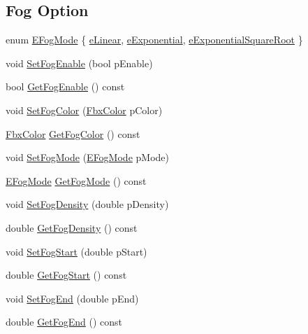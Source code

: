 \subsection*{Fog Option}
\begin{DoxyCompactItemize}
\item 
enum \hyperlink{class_fbx_global_light_settings_a2d6040cb267cbdb092bdf9fb73de8d6d}{E\+Fog\+Mode} \{ \hyperlink{class_fbx_global_light_settings_a2d6040cb267cbdb092bdf9fb73de8d6da646b9c79dbeb8d2d8ac6768e6e33d07c}{e\+Linear}, 
\hyperlink{class_fbx_global_light_settings_a2d6040cb267cbdb092bdf9fb73de8d6dac83435f2003c3a89d206f49ce9396562}{e\+Exponential}, 
\hyperlink{class_fbx_global_light_settings_a2d6040cb267cbdb092bdf9fb73de8d6da498e5d24544400cc9a9c959eadb3064c}{e\+Exponential\+Square\+Root}
 \}
\item 
void \hyperlink{class_fbx_global_light_settings_a8236e86da20394c673183e762760d6f0}{Set\+Fog\+Enable} (bool p\+Enable)
\item 
bool \hyperlink{class_fbx_global_light_settings_abceecba4b43b858168125d70c5d451ec}{Get\+Fog\+Enable} () const
\item 
void \hyperlink{class_fbx_global_light_settings_a021ab12c926a62587c8e97b579f3d1d6}{Set\+Fog\+Color} (\hyperlink{class_fbx_color}{Fbx\+Color} p\+Color)
\item 
\hyperlink{class_fbx_color}{Fbx\+Color} \hyperlink{class_fbx_global_light_settings_a78ab759ac52d0d618eb275a9149feedd}{Get\+Fog\+Color} () const
\item 
void \hyperlink{class_fbx_global_light_settings_a61010aa498fa159fa6fa91cf77d78501}{Set\+Fog\+Mode} (\hyperlink{class_fbx_global_light_settings_a2d6040cb267cbdb092bdf9fb73de8d6d}{E\+Fog\+Mode} p\+Mode)
\item 
\hyperlink{class_fbx_global_light_settings_a2d6040cb267cbdb092bdf9fb73de8d6d}{E\+Fog\+Mode} \hyperlink{class_fbx_global_light_settings_a29f90b9f3f5c1a9057cf226c80892df1}{Get\+Fog\+Mode} () const
\item 
void \hyperlink{class_fbx_global_light_settings_a9aa9fb5c44351b8b4ef9caf1968ca32f}{Set\+Fog\+Density} (double p\+Density)
\item 
double \hyperlink{class_fbx_global_light_settings_ad69be94b5061ada689c5103f8b3c44c2}{Get\+Fog\+Density} () const
\item 
void \hyperlink{class_fbx_global_light_settings_a5d8cf2b4c90e5cfedcd2169aa8321ebf}{Set\+Fog\+Start} (double p\+Start)
\item 
double \hyperlink{class_fbx_global_light_settings_a36162af4c56d06d37ce07ebd7a4d52a6}{Get\+Fog\+Start} () const
\item 
void \hyperlink{class_fbx_global_light_settings_a3408c6c5b1cf643ebe81cd4daaac82dc}{Set\+Fog\+End} (double p\+End)
\item 
double \hyperlink{class_fbx_global_light_settings_a04ed07f18330b888bd4439038e3dad2a}{Get\+Fog\+End} () const
\end{DoxyCompactItemize}
